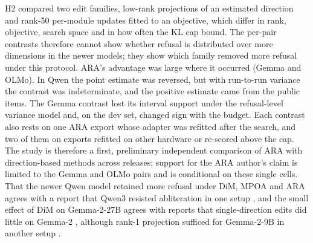H2 compared two edit families, low-rank projections of an estimated direction
and rank-50 per-module updates fitted to an objective, which differ in rank,
objective, search space and in how often the KL cap bound. The per-pair
contrasts therefore cannot show whether refusal is distributed over more
dimensions in the newer models; they show which family removed more refusal
under this protocol. ARA's advantage was large where it occurred (Gemma and
OLMo). In Qwen the point estimate was reversed, but with run-to-run variance
the contrast was indeterminate, and the positive estimate came from the
public items. The Gemma contrast lost its interval support under the
refusal-level variance model and, on the dev set, changed sign with the
budget. Each
contrast also rests on one ARA export whose adapter was refitted after the
search, and two of them on exports refitted on other hardware or re-scored
above the cap. The study is therefore a first, preliminary independent
comparison of ARA with direction-based methods across releases; support for
the ARA author's claim \cite{weidmann2026ara} is limited to the Gemma and OLMo
pairs and is conditional on these single cells. That the newer Qwen model
retained more refusal under DiM, MPOA and ARA agrees with a report that Qwen3
resisted abliteration in one setup \cite{agnihotri2025granular}, and the small
effect of DiM on Gemma-2-27B agrees with reports that single-direction edits
did little on Gemma-2 \cite{lee2026skindeep,siu2025cosmic}, although rank-1
projection sufficed for Gemma-2-9B in another setup
\cite{nakamura2026measuring}.


